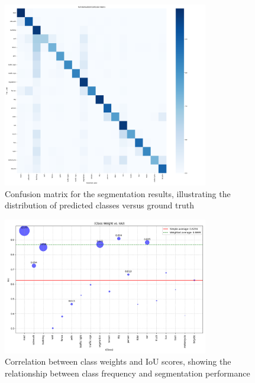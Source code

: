 \documentclass[]{article}
\begin{document}
\begin{figure}[htbp]
    \centering
    \includegraphics[width=0.8\textwidth]{outputs/deeplabv3plus_test_results/full_confusion_matrix.png}
    \caption{Confusion matrix for the segmentation results, illustrating the distribution of predicted classes versus ground truth}
    \label{fig:confusion_matrix}
\end{figure}

\begin{figure}[htbp]
    \centering
    \includegraphics[width=0.8\textwidth]{outputs/deeplabv3plus_test_results/class_weight_vs_iou.png}
    \caption{Correlation between class weights and IoU scores, showing the relationship between class frequency and segmentation performance}
    \label{fig:class_weight_vs_iou}
\end{figure}
\end{document}
